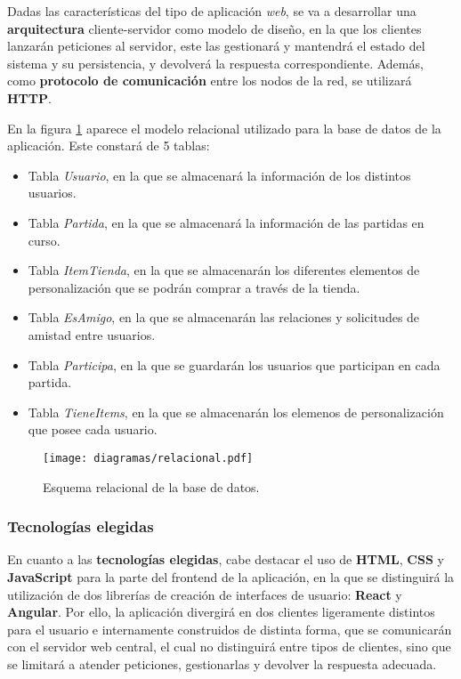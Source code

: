 \documentclass[11pt, a4paper, titlepage]{article}
\begin{document}
Dadas las características del tipo de aplicación \textit{web}, se va a desarrollar una \textbf{arquitectura} cliente-servidor como modelo de diseño, en la que los clientes lanzarán peticiones al servidor, este las gestionará y mantendrá el estado del sistema y su persistencia, y devolverá la respuesta correspondiente. Además, como \textbf{protocolo de comunicación} entre los nodos de la red, se utilizará \textbf{HTTP}.

En la figura \ref{ref:relacional} aparece el modelo relacional utilizado para la base de datos de la aplicación. Este constará de 5 tablas:
\begin{itemize}
    \item Tabla \textit{Usuario}, en la que se almacenará la información de los distintos usuarios.
    \item Tabla \textit{Partida}, en la que se almacenará la información de las partidas en curso.
    \item Tabla \textit{ItemTienda}, en la que se almacenarán los diferentes elementos de personalización que se podrán comprar a través de la tienda.
    \item Tabla \textit{EsAmigo}, en la que se almacenarán las relaciones y solicitudes de amistad entre usuarios.
    \item Tabla \textit{Participa}, en la que se guardarán los usuarios que participan en cada partida.
    \item Tabla \textit{TieneItems}, en la que se almacenarán los elemenos de personalización que posee cada usuario.
\end{itemize}
\begin{figure}[h!]
    \centering
    \texttt{[image: diagramas/relacional.pdf]}
    \caption{Esquema relacional de la base de datos.}
    \label{ref:relacional}
\end{figure}

\subsubsection{Tecnologías elegidas}

En cuanto a las \textbf{tecnologías elegidas}, cabe destacar el uso de \textbf{HTML}, \textbf{CSS} y \textbf{JavaScript} para la parte del frontend de la aplicación, en la que se distinguirá la utilización de dos librerías de creación de interfaces de usuario: \textbf{React} y \textbf{Angular}. Por ello, la aplicación divergirá en dos clientes ligeramente distintos para el usuario e internamente construidos de distinta forma, que se comunicarán con el servidor web central, el cual no distinguirá entre tipos de clientes, sino que se limitará a atender peticiones, gestionarlas y devolver la respuesta adecuada. \newline
\end{document}
